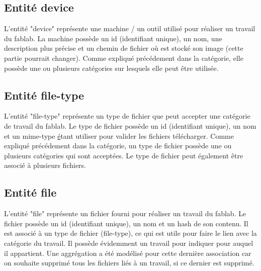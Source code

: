 \documentclass[
    iai, %
    il, %
]{heig-tb}
\begin{document}
\subsection{Entité device}
L'entité "device" représente une machine / un outil utilisé pour réaliser un travail du fablab.\newline
La machine possède un id (identifiant unique), un nom, une description plus précise et un chemin de fichier où est stocké son image (cette partie pourrait changer).\newline
Comme expliqué précédement dans la catégorie, elle possède une ou plusieurs catégories sur lesquels elle peut être utilisée.\newline

\subsection{Entité file-type}
L'entité "file-type" représente un type de fichier que peut accepter une catégorie de travail du fablab.\newline
Le type de fichier possède un id (identifiant unique), un nom et un mime-type \href{https://developer.mozilla.org/fr/docs/Web/HTTP/Basics_of_HTTP/MIME_Types} étant utiliser pour valider les fichiers télécharger.\newline
Comme expliqué précédement dans la catégorie, un type de fichier possède une ou plusieurs catégories qui sont acceptées.\newline
Le type de fichier peut également être associé à plusieurs fichiers.

\subsection{Entité file}
L'entité "file" représente un fichier fourni pour réaliser un travail du fablab.\newline
Le fichier possède un id (identifiant unique), un nom et un hash de son contenu.\newline
Il est associé à un type de fichier (file-type), ce qui est utile pour faire le lien avec la catégorie du travail.\newline
Il possède évidemment un travail pour indiquer pour auquel il appartient.\newline
Une aggrégation a été modélisé pour cette dernière association car on souhaite supprimé tous les fichiers liés à un travail, si ce dernier est supprimé.
\end{document}
